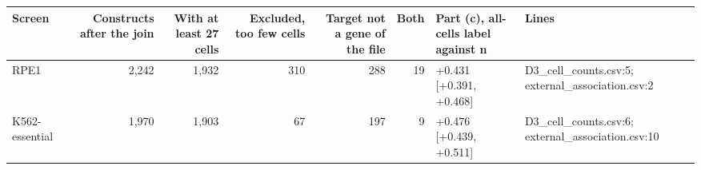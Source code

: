 \begin{tabular}{lrrrrrll}
\toprule
Screen & Constructs after the join & With at least 27 cells & Excluded, too few cells & Target not a gene of the file & Both & Part (c), all-cells label against n & Lines \\
\midrule
RPE1 & 2,242 & 1,932 & 310 & 288 & 19 & +0.431 [+0.391, +0.468] & D3\_cell\_counts.csv:5; external\_association.csv:2 \\
K562-essential & 1,970 & 1,903 & 67 & 197 & 9 & +0.476 [+0.439, +0.511] & D3\_cell\_counts.csv:6; external\_association.csv:10 \\
\bottomrule
\end{tabular}
